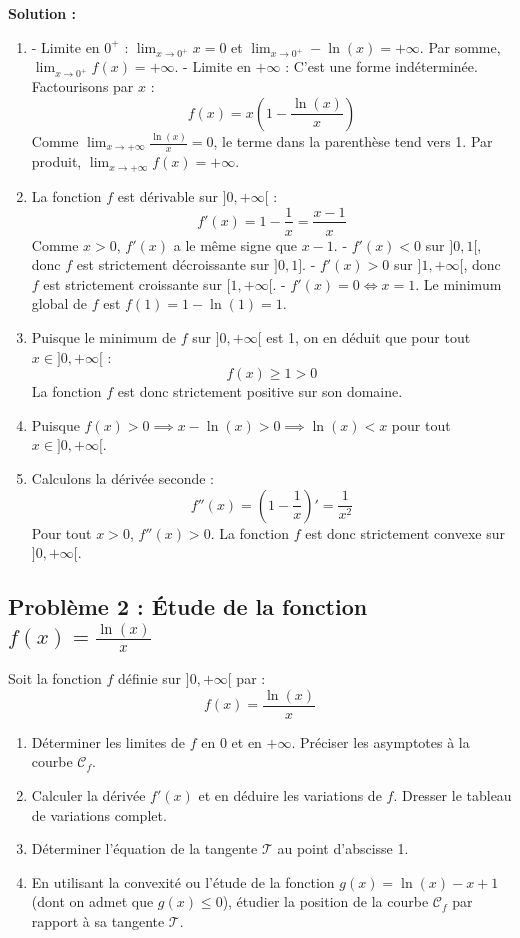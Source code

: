 \textbf{Solution :}
\begin{enumerate}
    \item - Limite en $0^+$ : $\lim_{x \to 0^+} x = 0$ et $\lim_{x \to 0^+} -\ln(x) = +\infty$. Par somme, $\lim_{x \to 0^+} f(x) = +\infty$.
      - Limite en $+\infty$ : C'est une forme indéterminée. Factourisons par $x$ :
      \[
      f(x) = x \left( 1 - \frac{\ln(x)}{x} \right)
      \]
      Comme $\lim_{x \to +\infty} \frac{\ln(x)}{x} = 0$, le terme dans la parenthèse tend vers 1. Par produit, $\lim_{x \to +\infty} f(x) = +\infty$.
      
    \item La fonction $f$ est dérivable sur $]0, +\infty[$ :
      \[
      f'(x) = 1 - \frac{1}{x} = \frac{x-1}{x}
      \]
      Comme $x > 0$, $f'(x)$ a le même signe que $x-1$.
      - $f'(x) < 0$ sur $]0, 1[$, donc $f$ est strictement décroissante sur $]0, 1]$.
      - $f'(x) > 0$ sur $]1, +\infty[$, donc $f$ est strictement croissante sur $[1, +\infty[$.
      - $f'(x) = 0 \iff x = 1$.
      Le minimum global de $f$ est $f(1) = 1 - \ln(1) = 1$.
      
    \item Puisque le minimum de $f$ sur $]0, +\infty[$ est 1, on en déduit que pour tout $x \in ]0, +\infty[$ :
      \[
      f(x) \ge 1 > 0
      \]
      La fonction $f$ est donc strictement positive sur son domaine.
      
    \item Puisque $f(x) > 0 \implies x - \ln(x) > 0 \implies \ln(x) < x$ pour tout $x \in ]0, +\infty[$.
    
    \item Calculons la dérivée seconde :
      \[
      f''(x) = \left( 1 - \frac{1}{x} \right)' = \frac{1}{x^2}
      \]
      Pour tout $x > 0$, $f''(x) > 0$. La fonction $f$ est donc strictement convexe sur $]0, +\infty[$.
\end{enumerate}

\subsection*{Problème 2 : Étude de la fonction $f(x) = \frac{\ln(x)}{x}$}
Soit la fonction $f$ définie sur $]0, +\infty[$ par :
\[
f(x) = \frac{\ln(x)}{x}
\]
\begin{enumerate}
    \item Déterminer les limites de $f$ en 0 et en $+\infty$. Préciser les asymptotes à la courbe $\mathcal{C}_f$.
    \item Calculer la dérivée $f'(x)$ et en déduire les variations de $f$. Dresser le tableau de variations complet.
    \item Déterminer l'équation de la tangente $\mathcal{T}$ au point d'abscisse 1.
    \item En utilisant la convexité ou l'étude de la fonction $g(x) = \ln(x) - x + 1$ (dont on admet que $g(x) \le 0$), étudier la position de la courbe $\mathcal{C}_f$ par rapport à sa tangente $\mathcal{T}$.
\end{enumerate}


